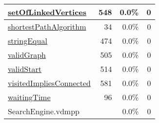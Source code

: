 \begin{longtable}{|l|r|r|r|}
\hline
\hyperref[setOfLinkedVertices:548]{setOfLinkedVertices} & 548&0.0\% & 0 \\
\hline
\hyperref[shortestPathAlgorithm:34]{shortestPathAlgorithm} & 34&0.0\% & 0 \\
\hline
\hyperref[stringEqual:474]{stringEqual} & 474&0.0\% & 0 \\
\hline
\hyperref[validGraph:505]{validGraph} & 505&0.0\% & 0 \\
\hline
\hyperref[validStart:514]{validStart} & 514&0.0\% & 0 \\
\hline
\hyperref[visitedImpliesConnected:581]{visitedImpliesConnected} & 581&0.0\% & 0 \\
\hline
\hyperref[waitingTime:96]{waitingTime} & 96&0.0\% & 0 \\
\hline
\hline
SearchEngine.vdmpp & & 0.0\% & 0 \\
\hline
\end{longtable}

